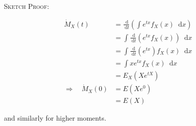 \documentclass[12pt,a4paper]{article}
\newcommand{\diff}{\;\mathrm{d}}
\begin{document}
\noindent\textsc{Sketch Proof:}\par\vspace{1cm}

\begin{align*}
\dot{M}_X(t) &= \frac{\diff}{\diff t}\left(\int\!\! e^{tx}f_X(x)\;\diff x\right)\\
&= \int\!\!\frac{\diff}{\diff t}\left(e^{tx}f_X(x)\right)\;\diff x\\
&= \int\!\!\frac{\diff}{\diff t}\left(e^{tx}\right)f_X(x)\;\diff x\\
&= \int\!\! xe^{tx}f_X(x)\;\diff x\\
&= E_X\left(Xe^{tX}\right)\\
\Rightarrow\quad \dot{M}_X(0) &= E\left(Xe^0\right)\\
&= E(X)
\end{align*}

and similarly for higher moments.
\end{document}
